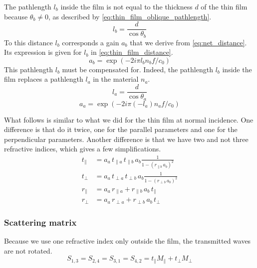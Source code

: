 The pathlength $l_b$ inside the film is not equal to the thickness $d$ of the thin film because $\theta_b \ne 0$, as described by \cref{eq:thin_film_oblique_pathlength}.
\begin{equation}
    l_b = \frac{d}{\cos \theta_b}
    \label{eq:thin_film_oblique_pathlength}
\end{equation}
To this distance $l_b$ corresponds a gain $a_b$ that we derive from \cref{eq:net_distance}.
Its expression is given for $l_b$ in \cref{eq:thin_film_distance}.
\begin{equation}
    a_b = \exp(-2i \pi l_b n_b f / c_0)
    \label{eq:thin_film_distance}
\end{equation}
This pathlength $l_b$ must be compensated for.
Indeed, the pathlength $l_b$ inside the film replaces a pathlength $l_a$ in the material $n_a$.
\begin{equation}
    l_a = \frac{d}{\cos \theta_a}
    \label{eq:thin_film_oblique_pathlength_compensation}
\end{equation}
\begin{equation}
    a_a = \exp(-2i \pi (-l_a) n_a f / c_0)
    \label{eq:thin_film_distance_compensation}
\end{equation}

What follows is similar to what we did for the thin film at normal incidence.
One difference is that do it twice, one for the parallel parameters and one for the perpendicular parameters.
Another difference is that we have two and not three refractive indices, which gives a few simplifications.
\begin{subequations}
    \begin{align}
        t_\parallel
        &=
        a_a \,
        t_{\parallel a} \, t_{\parallel b} \, a_b
        \frac{1}{
            1 - (r_{\parallel b} \, a_b)^2
        }
        \\
        t_\perp
        &=
        a_a \,
        t_{\perp a} \, t_{\perp b} \, a_b
        \frac{1}{
            1 - (r_{\perp b} \, a_b)^2
        }
        \\
        r_\parallel
        &=
        a_a \,
        r_{\parallel a} + r_{\parallel b} \, a_b \, t_\parallel
        \\
        r_\perp
        &=
        a_a \,
        r_{\perp a} + r_{\perp b} \, a_b \, t_\perp
    \end{align}
\end{subequations}

\subsubsection{Scattering matrix}
Because we use one refractive index only outside the film, the transmitted waves are not rotated.
\begin{equation}
    S_{1, 3} =
    S_{2, 4} =
    S_{3, 1} =
    S_{4, 2} =
    t_\parallel M_\parallel
    +
    t_\perp M_\perp
    \label{eq:thin_film_s_t}
\end{equation}

